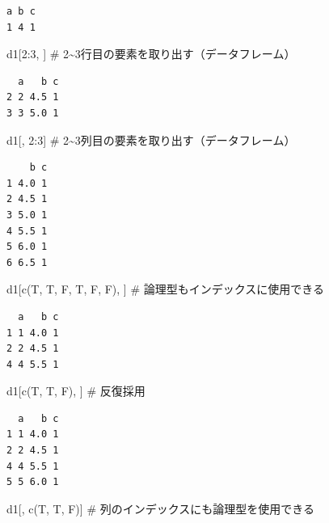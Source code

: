 \documentclass[
  letterpaper,
  DIV=11,
  numbers=noendperiod]{scrreprt}
\newenvironment{Shaded}{\begin{snugshade}}{\end{snugshade}}
\newcommand{\CommentTok}[1]{\textcolor[rgb]{0.37,0.37,0.37}{#1}}
\newcommand{\DecValTok}[1]{\textcolor[rgb]{0.68,0.00,0.00}{#1}}
\newcommand{\FunctionTok}[1]{\textcolor[rgb]{0.28,0.35,0.67}{#1}}
\newcommand{\NormalTok}[1]{\textcolor[rgb]{0.00,0.23,0.31}{#1}}
\newcommand{\SpecialCharTok}[1]{\textcolor[rgb]{0.37,0.37,0.37}{#1}}
\begin{document}
\begin{verbatim}
a b c 
1 4 1 
\end{verbatim}

\begin{Shaded}
\begin{Highlighting}[]
\NormalTok{d1[}\DecValTok{2}\SpecialCharTok{:}\DecValTok{3}\NormalTok{, ] }\CommentTok{\# 2\textasciitilde{}3行目の要素を取り出す（データフレーム）}
\end{Highlighting}
\end{Shaded}

\begin{verbatim}
  a   b c
2 2 4.5 1
3 3 5.0 1
\end{verbatim}

\begin{Shaded}
\begin{Highlighting}[]
\NormalTok{d1[, }\DecValTok{2}\SpecialCharTok{:}\DecValTok{3}\NormalTok{] }\CommentTok{\# 2\textasciitilde{}3列目の要素を取り出す（データフレーム）}
\end{Highlighting}
\end{Shaded}

\begin{verbatim}
    b c
1 4.0 1
2 4.5 1
3 5.0 1
4 5.5 1
5 6.0 1
6 6.5 1
\end{verbatim}

\begin{Shaded}
\begin{Highlighting}[]
\NormalTok{d1[}\FunctionTok{c}\NormalTok{(T, T, F, T, F, F), ] }\CommentTok{\# 論理型もインデックスに使用できる}
\end{Highlighting}
\end{Shaded}

\begin{verbatim}
  a   b c
1 1 4.0 1
2 2 4.5 1
4 4 5.5 1
\end{verbatim}

\begin{Shaded}
\begin{Highlighting}[]
\NormalTok{d1[}\FunctionTok{c}\NormalTok{(T, T, F), ] }\CommentTok{\# 反復採用}
\end{Highlighting}
\end{Shaded}

\begin{verbatim}
  a   b c
1 1 4.0 1
2 2 4.5 1
4 4 5.5 1
5 5 6.0 1
\end{verbatim}

\begin{Shaded}
\begin{Highlighting}[]
\NormalTok{d1[, }\FunctionTok{c}\NormalTok{(T, T, F)] }\CommentTok{\# 列のインデックスにも論理型を使用できる}
\end{Highlighting}
\end{Shaded}
\end{document}
